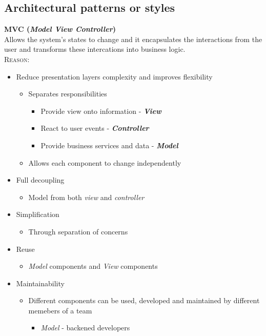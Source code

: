 \documentclass[a4paper,12pt]{article}
\begin{document}
\subsection{Architectural patterns or styles}
\textbf{MVC (\textit{Model View Controller})}\\
Allows the system's states to change and it encapsulates the interactions
from the user and transforms these intercations into business logic.\\
\textsc{Reason:}
	\begin{itemize}
		\item Reduce presentation layers complexity and  improves flexibility
			\begin{itemize}
				\item Separates responsibilities
					\begin{itemize}
						\item Provide view onto information -\textbf{\textit{ View}}
						\item React to user events - \textbf{\textit{Controller}}
						\item Provide business services  and data - \textbf{\textit{Model}}
					\end{itemize}
				\item Allows each component to change independently
			\end{itemize}
		\item Full decoupling
			\begin{itemize}
				\item Model from both \textit{view} and \textit{controller}
			\end{itemize}
		\item Simplification
			\begin{itemize}
				\item Through separation of concerns
			\end{itemize}
		\item Reuse
			\begin{itemize}
				\item \textit{Model} components and \textit{View} components 
			\end{itemize}
		\item Maintainability
			\begin{itemize}
				\item Different components can be used, developed and maintained by different memebers of a team 
					\begin{itemize}
						\item \textit{Model} - backened developers

\end{itemize}
\end{itemize}
\end{itemize}
\end{document}
